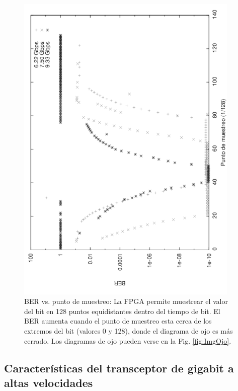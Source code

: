 \begin{figure}[t]
  \centering
    \includegraphics[width=4.2in,angle=270]{graphs/BER_sp_gray.pdf}
\caption {BER vs. punto de muestreo: La FPGA permite muestrear el valor del bit en 128 puntos equidistantes dentro del tiempo de bit. El BER aumenta cuando el punto de muestreo esta cerca de los extremos del bit (valores 0 y 128), donde el diagrama de ojo es más cerrado. Los diagramas de ojo pueden verse en la Fig. \ref{fig:ImgOjo}.}
\label{fig:BERvsSamplingPoint}
\end{figure}

\subsection{Características del transceptor de gigabit a altas velocidades}


